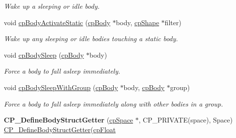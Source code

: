 \begin{DoxyCompactItemize}
\begin{DoxyCompactList}\small\item\em Wake up a sleeping or idle body. \end{DoxyCompactList}\item 
\hypertarget{group__cp_body_gaad8cfcc01f2a5a4ab4e98c49e2442063}{void \hyperlink{group__cp_body_gaad8cfcc01f2a5a4ab4e98c49e2442063}{cp\-Body\-Activate\-Static} (\hyperlink{structcp_body}{cp\-Body} $\ast$body, \hyperlink{structcp_shape}{cp\-Shape} $\ast$filter)}\label{group__cp_body_gaad8cfcc01f2a5a4ab4e98c49e2442063}

\begin{DoxyCompactList}\small\item\em Wake up any sleeping or idle bodies touching a static body. \end{DoxyCompactList}\item 
\hypertarget{group__cp_body_ga7308ff2bd6dc2832230636c02c682e82}{void \hyperlink{group__cp_body_ga7308ff2bd6dc2832230636c02c682e82}{cp\-Body\-Sleep} (\hyperlink{structcp_body}{cp\-Body} $\ast$body)}\label{group__cp_body_ga7308ff2bd6dc2832230636c02c682e82}

\begin{DoxyCompactList}\small\item\em Force a body to fall asleep immediately. \end{DoxyCompactList}\item 
\hypertarget{group__cp_body_gaaa53f3fb37c705c4fbbd5b607f29c721}{void \hyperlink{group__cp_body_gaaa53f3fb37c705c4fbbd5b607f29c721}{cp\-Body\-Sleep\-With\-Group} (\hyperlink{structcp_body}{cp\-Body} $\ast$body, \hyperlink{structcp_body}{cp\-Body} $\ast$group)}\label{group__cp_body_gaaa53f3fb37c705c4fbbd5b607f29c721}

\begin{DoxyCompactList}\small\item\em Force a body to fall asleep immediately along with other bodies in a group. \end{DoxyCompactList}\item 
\hypertarget{group__cp_body_gab7a0675765d7fe5c6b756d106236bb20}{{\bfseries C\-P\-\_\-\-Define\-Body\-Struct\-Getter} (\hyperlink{structcp_space}{cp\-Space} $\ast$, C\-P\-\_\-\-P\-R\-I\-V\-A\-T\-E(space), Space) \hyperlink{group__cp_body_gab5b6d43e0e8bdfbdad54fddc6cbb7795}{C\-P\-\_\-\-Define\-Body\-Struct\-Getter}(\hyperlink{group__basic_types_gac1ed65573e035bf892505768c852d8d3}{cp\-Float}}\label{group__cp_body_gab7a0675765d7fe5c6b756d106236bb20}


\end{DoxyCompactItemize}
